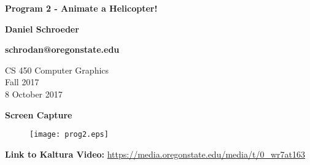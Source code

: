 \documentclass[10pt, draftclsnofoot, onecolumn]{IEEEtran}
\begin{document}
\begin{titlepage}
    \begin{center}
        \vspace*{1.5cm}

        \textbf{Program 2 - Animate a Helicopter!}

        \textbf{Daniel Schroeder}
        
        \textbf{schrodan@oregonstate.edu}

        \vspace{1.5cm}

        CS 450 Computer Graphics\\
        Fall 2017\\
        8 October 2017\\

        \vspace{1.5cm}

        \textbf{Screen Capture}
		\begin{figure}[H]
            \centering
            \texttt{[image: prog2.eps]}
        \end{figure}

        \vspace{1.5cm}

        \textbf{Link to Kaltura Video:} 
        \url{https://media.oregonstate.edu/media/t/0_wr7at163}

    \end{center}
\end{titlepage}
\end{document}
